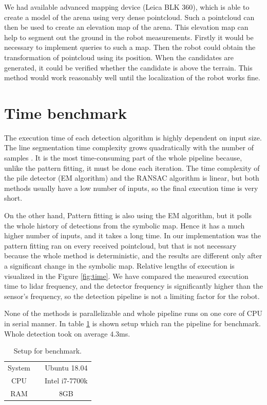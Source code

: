 We had available advanced mapping device (Leica BLK 360), which is able to create a model of the arena using very dense pointcloud. Such a pointcloud can then be used to create an elevation map of the arena. This elevation map can help to segment out the ground in the robot measurements. Firstly it would be necessary to implement queries to such a map. Then the robot could obtain the transformation of pointcloud using its position. When the candidates are generated, it could be verified whether the candidate is above the terrain. This method would work reasonably well until the localization of the robot works fine.

\section{Time benchmark}
The execution time of each detection algorithm is highly dependent on input size. The line segmentation time complexity grows quadratically with the number of samples \cite{hershberger2000}. It is the most time-consuming part of the whole pipeline because, unlike the pattern fitting, it must be done each iteration. The time complexity of the pile detector (EM algorithm) and the RANSAC algorithm is linear, but both methods usually have a low number of inputs, so the final execution time is very short. 

On the other hand, Pattern fitting is also using the EM algorithm, but it polls the whole history of detections from the symbolic map. Hence it has a much higher number of inputs, and it takes a long time. In our implementation was the pattern fitting ran on every received pointcloud, but that is not necessary because the whole method is deterministic, and the results are different only after a significant change in the symbolic map. Relative lengths of execution is visualized in the Figure \ref{fig:time}. We have compared the measured execution time to lidar frequency, and the detector frequency is significantly higher than the sensor's frequency, so the detection pipeline is not a limiting factor for the robot.

None of the methods is parallelizable and whole pipeline runs on one core of CPU in serial manner. In table \ref{tab:benchmark} is shown setup which ran the pipeline for benchmark. Whole detection took on average $4.3$ms.

\begin{table}[H]
	\centering
	\caption{Setup for benchmark.}
	\begin{tabular}{ccc}
		\toprule
		System &\quad& Ubuntu 18.04 \\
		CPU &\quad& Intel i7-7700k  \\
		RAM &\quad& 8GB \\
		\bottomrule
	\end{tabular}
	\label{tab:benchmark}
\end{table}

